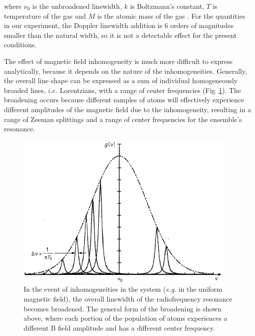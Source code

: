 where $\nu_0$ is the unbroadened linewidth, $k$ is Boltzmann's
constant, $T$ is temperature of the gas and $M$ is the atomic mass of
the gas \cite{yariv}. For the quantities in our experiment, the
Doppler linewidth addition is $6$ orders of magnitudes smaller than
the natural width, so it is not a detectable effect for the present
conditions.

The effect of magnetic field inhomogeneity is much more difficult to
express analytically, because it depends on the nature of the
inhomogeneities. Generally, the overall line shape can be expressed as
a sum of individual homogeneously broaded lines, $i.e.$ Lorentzians,
with a range of center frequencies
(Fig~\ref{fig:inhomo})\cite{vanier}. The broadening occurs because
different samples of atoms will effectively experience different
amplitudes of the magnetic field due to the inhomogeneity,
resulting in a range of Zeeman splittings and a range of center
frequencies for the ensemble's resonance.

\begin{figure}[h]
\begin{center}
\includegraphics[height=3in]{figures/inhomogeneous.eps}
\caption{\small{In the event of inhomogeneities in the system (\emph{e.g.} in the uniform magnetic field), the overall linewidth of the radiofrequency resonance becomes broadened. The general form of the broadening is shown above, where each portion of the population of atoms experiences a different B field amplitude and has a different center frequency.}}
\label{fig:inhomo}
\end{center}
\end{figure}